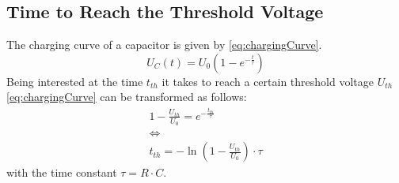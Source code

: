     \subsection*{Time to Reach the Threshold Voltage}\label{sec:preparation_task_6}
        The charging curve of a capacitor is given by \cref{eq:chargingCurve}.
        \begin{equation}
            U_C(t) = U_0 ( 1-e^{-\frac{t}{\tau}})
            \label{eq:chargingCurve}
        \end{equation}
        Being interested at the time \( t_{th} \) it takes to reach a certain threshold voltage \( U_{th} \) \cref{eq:chargingCurve}
        can be transformed as follows:
        \begin{gather}
            1- \frac{U_{th}}{U_0} = e^{-\frac{t_{th}}{\tau}} \nonumber \\
            \Leftrightarrow \nonumber \\
            t_{th} = - \ln\left(1- \frac{U_{th}}{U_0}\right) \cdot \tau
            \label{eq:timeToThresholfVoltage}
        \end{gather}
        with the time constant \( \tau = R \cdot C \).
